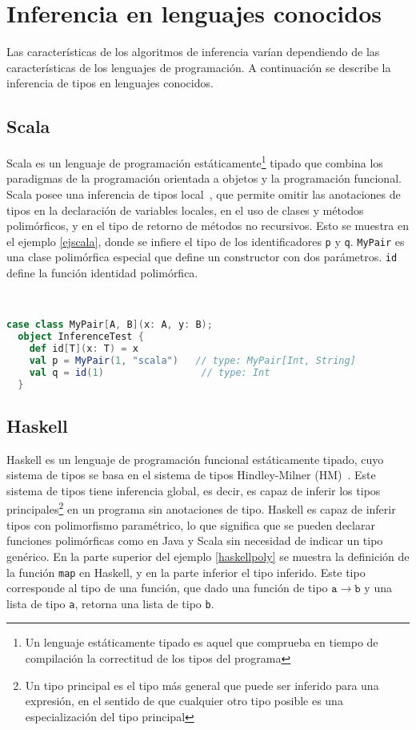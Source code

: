\section{Inferencia en lenguajes conocidos}
Las características de los algoritmos de inferencia varían dependiendo de las características de los lenguajes de programación. A continuación se describe la inferencia de tipos en lenguajes conocidos.

\subsection{Scala}
Scala es un lenguaje de programación estáticamente\footnote{Un lenguaje estáticamente tipado es aquel que comprueba en tiempo de compilación la correctitud de los tipos del programa} tipado que combina los paradigmas de la programación orientada a objetos y la programación funcional. Scala posee una inferencia de tipos local~\cite{odersky2}, que permite omitir las anotaciones de tipos en la declaración de variables locales, en el uso de clases y métodos polimórficos, y en el tipo de retorno de métodos no recursivos. Esto se muestra en el ejemplo \ref{ejscala}, donde se infiere el tipo de los identificadores \texttt{p} y \texttt{q}. \texttt{MyPair} es una clase polimórfica especial que define un constructor con dos parámetros. \texttt{id} define la función identidad polimórfica.
\clearpage
\begin{ej} \ \\
  \normalfont
  \label{ejscala}
\begin{lstlisting}[language=Scala]
  case class MyPair[A, B](x: A, y: B);
  object InferenceTest {
    def id[T](x: T) = x
    val p = MyPair(1, "scala")   // type: MyPair[Int, String]
    val q = id(1)                 // type: Int
  }
\end{lstlisting}
\end{ej}

\subsection{Haskell}
Haskell es un lenguaje de programación funcional estáticamente tipado, cuyo sistema de tipos se basa en el sistema de tipos Hindley-Milner (HM)~\cite{damasmilner}. Este sistema de tipos tiene inferencia global, es decir, es capaz de inferir los tipos principales\footnote{Un tipo principal es el tipo más general que puede ser inferido para una expresión, en el sentido de que cualquier otro tipo posible es una especialización del tipo principal} en un programa sin anotaciones de tipo. Haskell es capaz de inferir tipos con polimorfismo paramétrico, lo que significa que se pueden declarar funciones polimórficas como en Java y Scala sin necesidad de indicar un tipo genérico. En la parte superior del ejemplo \ref{haskellpoly} se muestra la definición de la función \texttt{map} en Haskell, y en la parte inferior el tipo inferido. Este tipo corresponde al tipo de una función, que dado una función de tipo $\mathtt{a \rightarrow b}$ y una lista de tipo \texttt{a}, retorna una lista de tipo \texttt{b}.

